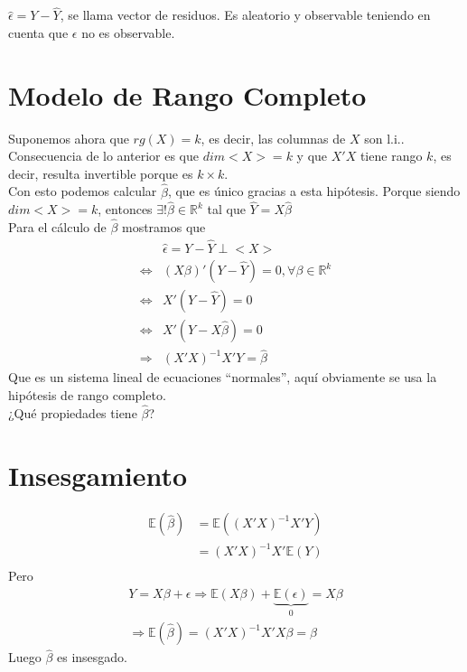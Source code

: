 \documentclass[10pt]{article}
\theoremstyle{plain}
\theoremstyle{definition}
\begin{document}
$\hat{\epsilon} = Y - \hat{Y}$, se llama vector de residuos. Es aleatorio y observable teniendo en cuenta que $\epsilon$ no es observable.


\section{Modelo de Rango Completo}
Suponemos ahora que $rg(X) = k$, es decir, las columnas de $X$ son l.i..\\

Consecuencia de lo anterior es que $dim <X> = k$ y que $X'X$ tiene rango $k$, es decir, resulta invertible porque es $k\times k$.\\
Con esto podemos calcular $\hat{\beta}$, que es único gracias a esta hipótesis. Porque siendo $dim <X> = k$, entonces $\exists ! \hat{\beta} \in \mathbb{R}^k$ tal que $\hat{Y} = X\hat{\beta}$\\

Para el cálculo de $\hat{\beta}$ mostramos que
\begin{align*}
& \hat{\epsilon} = Y - \hat{Y} \perp <X>\\
\Leftrightarrow & (X\beta)'(Y-\hat{Y}) = 0, \forall \beta \in \mathbb{R}^k\\
\Leftrightarrow & X'(Y-\hat{Y}) = 0\\
\Leftrightarrow & X'(Y-X\hat{\beta}) = 0\\
\Rightarrow & (X'X)^{-1}X'Y = \hat{\beta}
\end{align*}
Que es un sistema lineal de ecuaciones ``normales'', aquí obviamente se usa la hipótesis de rango completo.\\

¿Qué propiedades tiene $\hat{\beta}$?
\section{Insesgamiento}
\begin{align*}
\mathbb{E}(\hat{\beta}) &= \mathbb{E}((X'X)^{-1}X'Y)\\
&= (X'X)^{-1}X'\mathbb{E}(Y)\\
\end{align*}
Pero 
\begin{align*}
Y = X\beta + \epsilon \Rightarrow \mathbb{E}(X\beta) + \underbrace{\mathbb{E}(\epsilon)}_{0} = X\beta\\
\Rightarrow \mathbb{E}(\hat{\beta}) = (X'X)^{-1}X'X\beta = \beta
\end{align*}
Luego $\hat{\beta}$ es insesgado.\\
\end{document}
